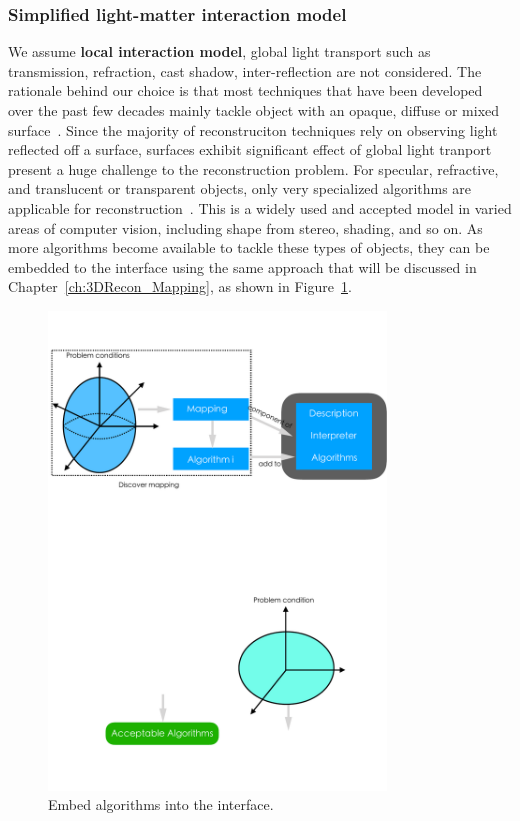 \subsubsection{Simplified light-matter interaction model}
We assume \textbf{local interaction model}, \ie global light transport such as transmission, refraction, cast shadow, inter-reflection are not considered. The rationale behind our choice is that most techniques that have been developed over the past few decades mainly tackle object with an opaque, diffuse or mixed surface~\cite{ihrke2010transparent}. Since the majority of reconstruciton techniques rely on observing light reflected off a surface, surfaces exhibit significant effect of global light tranport present a huge challenge to the reconstruction problem. For specular, refractive, and translucent or transparent objects, only very specialized algorithms are applicable for reconstruction~\cite{ihrke2010transparent}. This is a widely used and accepted model in varied areas of computer vision, including shape from stereo, shading, and so on. As more algorithms become available to tackle these types of objects, they can be embedded to the interface using the same approach that will be discussed in Chapter~\ref{ch:3DRecon_Mapping}, as shown in Figure~\ref{fig:embed_algo}.
\begin{figure}[!htbp]
\centering
\includegraphics[width=0.8\textwidth]{img/prob_space/embed_algo.pdf}
\caption{Embed algorithms into the interface.}
\label{fig:embed_algo}
\end{figure}

